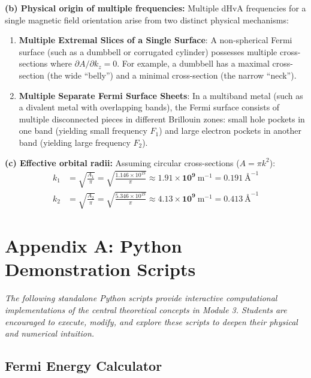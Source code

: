 \documentclass[11pt,a4paper]{article}
\begin{document}
\textbf{(b) Physical origin of multiple frequencies:}
Multiple dHvA frequencies for a single magnetic field orientation arise from two distinct physical mechanisms:
\begin{enumerate}
    \item \textbf{Multiple Extremal Slices of a Single Surface}: A non-spherical Fermi surface (such as a dumbbell or corrugated cylinder) possesses multiple cross-sections where $\partial A/\partial k_z = 0$. For example, a dumbbell has a maximal cross-section (the wide ``belly'') and a minimal cross-section (the narrow ``neck'').
    \item \textbf{Multiple Separate Fermi Surface Sheets}: In a multiband metal (such as a divalent metal with overlapping bands), the Fermi surface consists of multiple disconnected pieces in different Brillouin zones: small hole pockets in one band (yielding small frequency $F_1$) and large electron pockets in another band (yielding large frequency $F_2$).
\end{enumerate}

\textbf{(c) Effective orbital radii:}
Assuming circular cross-sections ($A = \pi k^2$):
\begin{align*}
k_1 &= \sqrt{\frac{A_1}{\pi}} = \sqrt{\frac{1.146 \times 10^{19}}{\pi}} \approx \mathbf{1.91 \times 10^9\ \mathrm{m^{-1}}} = 0.191\ \text{\AA}^{-1} \\
k_2 &= \sqrt{\frac{A_2}{\pi}} = \sqrt{\frac{5.346 \times 10^{19}}{\pi}} \approx \mathbf{4.13 \times 10^9\ \mathrm{m^{-1}}} = 0.413\ \text{\AA}^{-1}
\end{align*}

\clearpage


\clearpage
\appendix
\section{Appendix A: Python Demonstration Scripts}
\label{sec:appendix_python}

\noindent\textit{The following standalone Python scripts provide interactive computational implementations of the central theoretical concepts in Module 3. Students are encouraged to execute, modify, and explore these scripts to deepen their physical and numerical intuition.}

\subsection{Fermi Energy Calculator}
\end{document}
